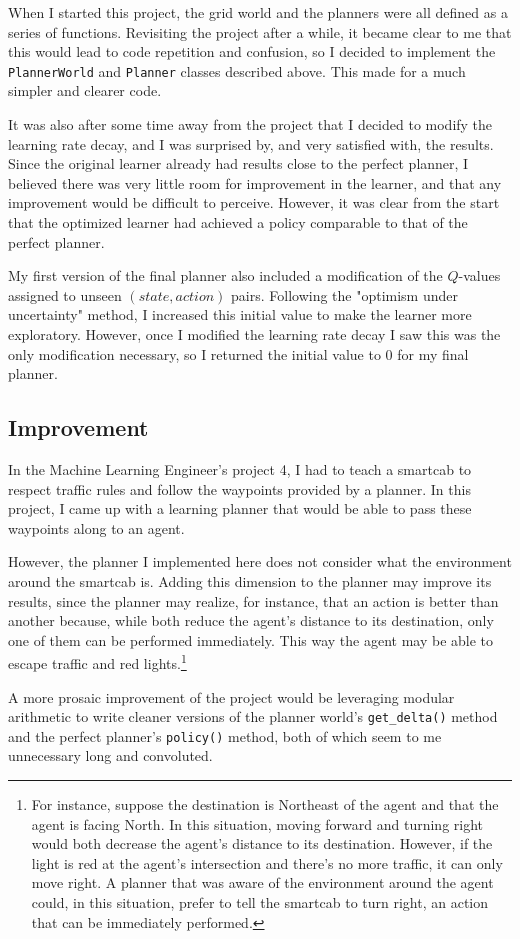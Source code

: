\documentclass{article}
\begin{document}
When I started this project, the grid world and the planners were all defined as a series of functions. Revisiting the project after a while, it became clear to me that this would lead to code repetition and confusion, so I decided to implement the \texttt{PlannerWorld} and \texttt{Planner} classes described above. This made for a much simpler and clearer code.

It was also after some time away from the project that I decided to modify the learning rate decay, and I was surprised by, and very satisfied with, the results. Since the original learner already had results close to the perfect planner, I believed there was very little room for improvement in the learner, and that any improvement would be difficult to perceive. However, it was clear from the start that the optimized learner had achieved a policy comparable to that of the perfect planner.

My first version of the final planner also included a modification of the $Q$-values assigned to unseen $(state, action)$ pairs. Following the "optimism under uncertainty" method, I increased this initial value to make the learner more exploratory. However, once I modified the learning rate decay I saw this was the only modification necessary, so I returned the initial value to 0 for my final planner.

\subsection{Improvement}

In the Machine Learning Engineer's project 4, I had to teach a smartcab to respect traffic rules and follow the waypoints provided by a planner. In this project, I came up with a learning planner that would be able to pass these waypoints along to an agent.

However, the planner I implemented here does not consider what the environment around the smartcab is. Adding this dimension to the planner may improve its results, since the planner may realize, for instance, that an action is better than another because, while both reduce the agent's distance to its destination, only one of them can be performed immediately. This way the agent may be able to escape traffic and red lights.\footnote{For instance, suppose the destination is Northeast of the agent and that the agent is facing North. In this situation, moving forward and turning right would both decrease the agent's distance to its destination. However, if the light is red at the agent's intersection and there's no more traffic, it can only move right. A planner that was aware of the environment around the agent could, in this situation, prefer to tell the smartcab to turn right, an action that can be immediately performed.}

A more prosaic improvement of the project would be leveraging modular arithmetic to write cleaner versions of the planner world's \texttt{get\_delta()} method and the perfect planner's \texttt{policy()} method, both of which seem to me unnecessary long and convoluted.
\end{document}
